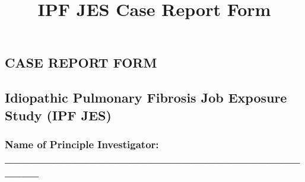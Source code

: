 \documentclass[a4paper,10pt]{article}
\begin{document}
 \newpage\title{\bf IPF JES Case Report Form}
 \date{}
 
 
 \pagestyle{fancy}
 
 
  \begin{centering} 
 \section*{CASE REPORT FORM}
 \end{centering}

 \subsection*{Idiopathic Pulmonary Fibrosis Job Exposure Study (IPF JES)}

 \vspace{0.2cm}

 \subsubsection*{Name of Principle Investigator: \_\_\_\_\_\_\_\_\_\_\_\_\_\_\_\_\_\_\_\_\_\_\_\_\_\_\_\_\_\_\_\_\_\_\_\_\_\_\_}

 \vspace{0.5cm}
\end{document}
